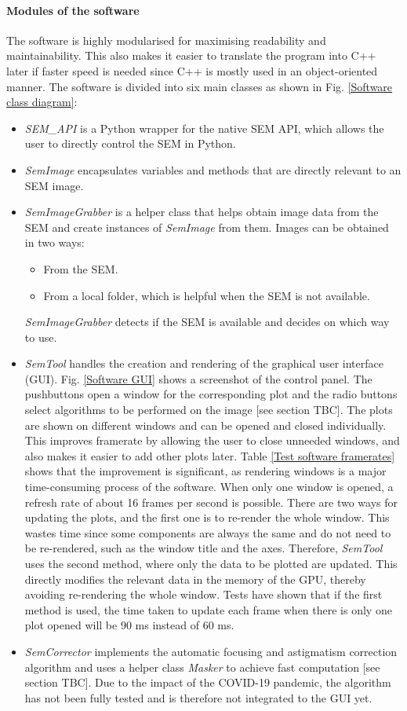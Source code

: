\documentclass[12pt, twocolumn]{report}
\begin{document}
\paragraph{Modules of the software}
The software is highly modularised for maximising readability and maintainability. This also makes it easier to translate the program into C++ later if faster speed is needed since C++ is mostly used in an object-oriented manner. The software is divided into six main classes as shown in Fig. \ref{Software class diagram}:
\begin{itemize}
    \item \textit{SEM\_API} is a Python wrapper for the native SEM API, which allows the user to directly control the SEM in Python.
    \item \textit{SemImage} encapsulates variables and methods that are directly relevant to an SEM image.
    \item \textit{SemImageGrabber} is a helper class that helps obtain image data from the SEM and create instances of \textit{SemImage} from them. Images can be obtained in two ways:
    \begin{itemize}
        \item From the SEM.
        \item From a local folder, which is helpful when the SEM is not available.
    \end{itemize}
    \textit{SemImageGrabber} detects if the SEM is available and decides on which way to use.
    \item \textit{SemTool} handles the creation and rendering of the graphical user interface (GUI). Fig. \ref{Software GUI} shows a screenshot of the control panel. The pushbuttons open a window for the corresponding plot and the radio buttons select algorithms to be performed on the image [see section TBC]. The plots are shown on different windows and can be opened and closed individually. This improves framerate by allowing the user to close unneeded windows, and also makes it easier to add other plots later. Table \ref{Test software framerates} shows that the improvement is significant, as rendering windows is a major time-consuming process of the software. When only one window is opened, a refresh rate of about 16 frames per second is possible. There are two ways for updating the plots, and the first one is to re-render the whole window. This wastes time since some components are always the same and do not need to be re-rendered, such as the window title and the axes. Therefore, \textit{SemTool} uses the second method, where only the data to be plotted are updated. This directly modifies the relevant data in the memory of the GPU, thereby avoiding re-rendering the whole window. Tests have shown that if the first method is used, the time taken to update each frame when there is only one plot opened will be 90 ms instead of 60 ms.
    \item \textit{SemCorrector} implements the automatic focusing and astigmatism correction algorithm and uses a helper class \textit{Masker} to achieve fast computation [see section TBC]. Due to the impact of the COVID-19 pandemic, the algorithm has not been fully tested and is therefore not integrated to the GUI yet.
\end{itemize}
\end{document}
